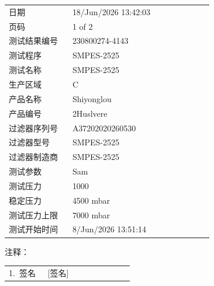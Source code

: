 \documentclass[UTF8,10pt,a4paper,fontset=fandol]{ctexart}
\newcommand{\fieldvalue}[1]{#1}
\newcommand{\handwritten}[1]{#1}
\begin{document}
\begin{tabular}{@{}p{0.28\linewidth}p{0.62\linewidth}@{}}
日期 &
\fieldvalue{18/Jun/2026 13:42:03}
\\
页码 &
\fieldvalue{1 of 2}
\\
测试结果编号 &
\fieldvalue{230800274-4143}
\\
测试程序 &
\fieldvalue{SMPES-2525}
\\
测试名称 &
\fieldvalue{SMPES-2525}
\\
生产区域 &
\fieldvalue{C}
\\
产品名称 &
\fieldvalue{Shiyonglou}
\\
产品编号 &
\fieldvalue{2Huslvere}
\\
过滤器序列号 &
\fieldvalue{A37202020260530}
\\
过滤器型号 &
\fieldvalue{SMPES-2525}
\\
过滤器制造商 &
\fieldvalue{SMPES-2525}
\\
测试参数 &
\fieldvalue{Sam}
\\
测试压力 &
\fieldvalue{1000}
\\
稳定压力 &
\fieldvalue{4500 mbar}
\\
测试压力上限 &
\fieldvalue{7000 mbar}
\\
测试开始时间 &
\fieldvalue{8/Jun/2026 13:51:14}
\\
\end{tabular}

\vspace{1em}

\noindent
注释：

\begin{tabular}{@{}p{0.28\linewidth}p{0.62\linewidth}@{}}
1.\ 签名 &
\fieldvalue{\handwritten{[签名]}}
\\
\end{tabular}
\end{document}
